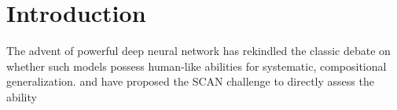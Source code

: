 \section{Introduction}
The advent of powerful deep neural network has rekindled the classic
debate on whether such models possess human-like abilities for
systematic, compositional generalization. \citet{Lake:Baroni:2017} and
\citet{Loula:etal:2018} have proposed the SCAN challenge to directly assess the ability 


